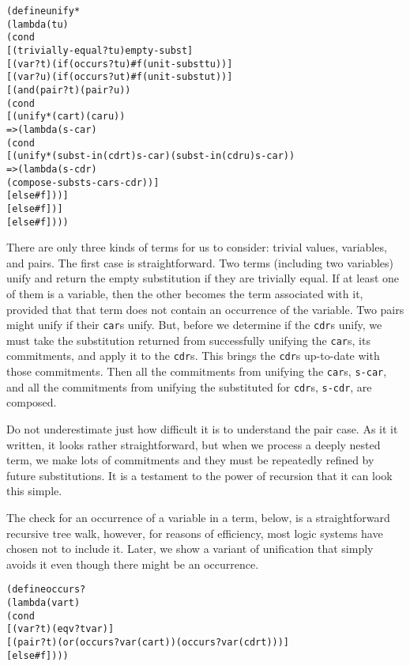\begin{alltt}
(define unify*
  (lambda (t u)
    (cond
      [(trivially-equal? t u) empty-subst]
      [(var? t) (if (occurs? t u) #f (unit-subst t u))]
      [(var? u) (if (occurs? u t) #f (unit-subst u t))]
      [(and (pair? t) (pair? u))
       (cond
         [(unify* (car t) (car u))
           => (lambda (s-car)
                (cond
                  [(unify* (subst-in (cdr t) s-car) (subst-in (cdr u) s-car))
                   => (lambda (s-cdr)
                        (compose-subst s-car s-cdr))]
                  [else #f]))]
         [else #f])]
      [else #f])))
\end{alltt}
There are only three kinds of terms for us to consider: trivial
values, variables, and pairs.  The first case is straightforward.  Two
terms (including two variables) unify and return the empty
substitution if they are trivially equal.  If at least one of them is
a variable, then the other becomes the term associated with it,
provided that that term does not contain an occurrence of the
variable.  Two pairs might unify if their \texttt{car}s unify.  But,
before we determine if the \texttt{cdr}s unify, we must take the
substitution returned from successfully unifying the \texttt{car}s,
its commitments, and apply it to the \texttt{cdr}s.  This brings the
\texttt{cdr}s up-to-date with those commitments.  Then all the
commitments from unifying the \texttt{car}s, \texttt{s-car}, and all
the commitments from unifying the substituted for \texttt{cdr}s,
\texttt{s-cdr}, are composed.

Do not underestimate just how difficult it is to understand the pair
case.  As it it written, it looks rather straightforward, but when we
process a deeply nested term, we make lots of commitments and they
must be repeatedly refined by future substitutions.  It is a testament
to the power of recursion that it can look this simple.

The check for an occurrence of a variable in a term, below, is a
straightforward recursive tree walk, however, for reasons of efficiency,
most logic systems have chosen not to include it.  Later, we show a
variant of unification that simply avoids it even though there might
be an occurrence.

\begin{alltt}
(define occurs?
  (lambda (var t)
    (cond
      [(var? t) (eqv? t var)]
      [(pair? t) (or (occurs? var (car t)) (occurs? var (cdr t)))]
      [else #f])))
\end{alltt}


